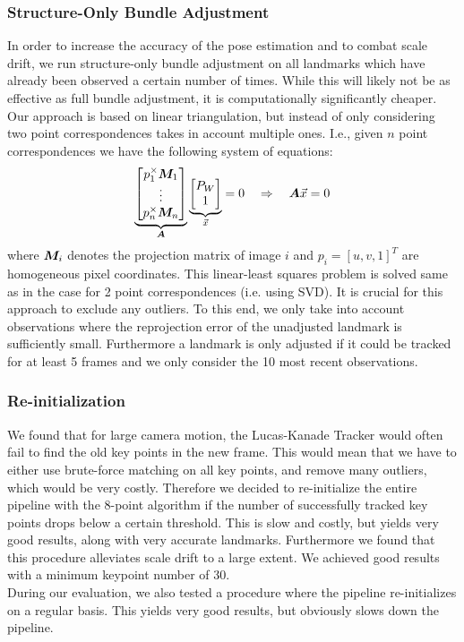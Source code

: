 \documentclass[11pt]{article}
\newcommand{\mat}{\matrixsym}
\begin{document}
\subsubsection{Structure-Only Bundle Adjustment}
In order to increase the accuracy of the pose estimation and to combat scale drift, we run structure-only bundle adjustment on all landmarks which have already been observed a certain number of times. While this will likely not be as effective as full bundle adjustment, it is computationally significantly cheaper.\\
Our approach is based on linear triangulation, but instead of only considering two point correspondences takes in account multiple ones. I.e., given $n$ point correspondences we have the following system of equations:
\begin{equation*}
\underbrace{\begin{bmatrix} p_1^\times \mat{M}_1\\ \vdots \\ p_n^\times \mat{M}_n \end{bmatrix}}_{\mat{A}} \underbrace{\begin{bmatrix} P_W \\ 1 \end{bmatrix}}_{\vec{x}} = 0 \quad \Rightarrow \quad \mat{A} \vec{x} = 0
\end{equation*}
where $\mat{M}_i$ denotes the projection matrix of image $i$ and $p_i = [u,v,1]^T$ are homogeneous pixel coordinates. This linear-least squares problem is solved same as in the case for 2 point correspondences (i.e. using SVD). It is crucial for this approach to exclude any outliers. To this end, we only take into account observations where the reprojection error of the unadjusted landmark is sufficiently small. Furthermore a landmark is only adjusted if it could be tracked for at least 5 frames and we only consider the 10 most recent observations.

\subsubsection{Re-initialization}
We found that for large camera motion, the Lucas-Kanade Tracker would often fail to find the old key points in the new frame. This would mean that we have to either use brute-force matching on all key points, and remove many outliers, which would be very costly. Therefore we decided to re-initialize the entire pipeline with the 8-point algorithm if the number of successfully tracked key points drops below a certain threshold. This is slow and costly, but yields very good results, along with very accurate landmarks. Furthermore we found that this procedure alleviates scale drift to a large extent. We achieved good results with a minimum keypoint number of 30.\\
During our evaluation, we also tested a procedure where the pipeline re-initializes on a regular basis. This yields very good results, but obviously slows down the pipeline.
\end{document}
